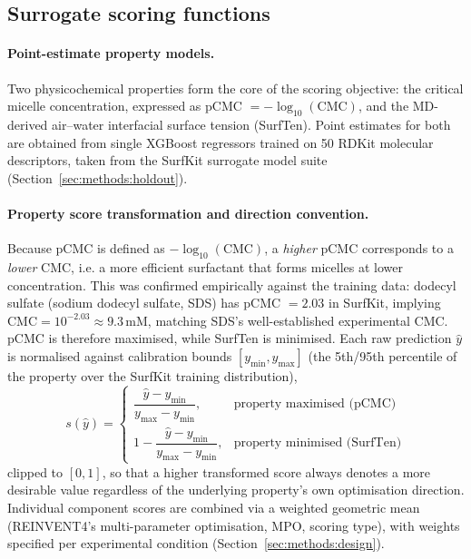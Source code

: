 \documentclass[11pt]{aime}
\begin{document}
\subsection{Surrogate scoring functions}
\label{sec:methods:scoring}

\paragraph{Point-estimate property models.}
Two physicochemical properties form the core of the scoring objective: the critical micelle concentration, expressed as pCMC $= -\log_{10}(\mathrm{CMC})$, and the MD-derived air--water interfacial surface tension (SurfTen).
Point estimates for both are obtained from single XGBoost regressors\cite{chen_xgboost_2016} trained on 50 RDKit\cite{landrum2006rdkit} molecular descriptors, taken from the SurfKit surrogate model suite\cite{beckmann_surfkit_2026} (Section~\ref{sec:methods:holdout}).

\paragraph{Property score transformation and direction convention.}
Because pCMC is defined as $-\log_{10}(\mathrm{CMC})$, a \emph{higher} pCMC corresponds to a \emph{lower} CMC, i.e. a more efficient surfactant that forms micelles at lower concentration.
This was confirmed empirically against the training data: dodecyl sulfate (sodium dodecyl sulfate, SDS) has pCMC $=2.03$ in SurfKit, implying $\mathrm{CMC}=10^{-2.03}\approx9.3$\,mM, matching SDS's well-established experimental CMC.
pCMC is therefore maximised, while SurfTen is minimised.
Each raw prediction $\hat{y}$ is normalised against calibration bounds $[y_\mathrm{min}, y_\mathrm{max}]$ (the 5th/95th percentile of the property over the SurfKit training distribution),
\begin{equation}
    s(\hat{y}) =
    \begin{cases}
        \dfrac{\hat{y}-y_\mathrm{min}}{y_\mathrm{max}-y_\mathrm{min}}, & \text{property maximised (pCMC)}\\[1.2ex]
        1-\dfrac{\hat{y}-y_\mathrm{min}}{y_\mathrm{max}-y_\mathrm{min}}, & \text{property minimised (SurfTen)}
    \end{cases}
    \label{eq:normalize}
\end{equation}
clipped to $[0,1]$, so that a higher transformed score always denotes a more desirable value regardless of the underlying property's own optimisation direction.
Individual component scores are combined via a weighted geometric mean (REINVENT4's multi-parameter optimisation, MPO, scoring type), with weights specified per experimental condition (Section~\ref{sec:methods:design}).
\end{document}
